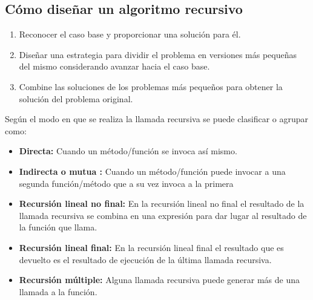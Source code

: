 \subsection{Cómo diseñar un algoritmo recursivo}

\begin{enumerate}
	\item Reconocer el caso base y proporcionar una solución
para él.
	\item Diseñar una estrategia para dividir el problema en
versiones más pequeñas del mismo considerando
avanzar hacia el caso base.
	\item Combine las soluciones de los problemas más
pequeños para obtener la solución del problema
original.
\end{enumerate}


Según el modo en que se realiza la llamada recursiva se puede clasificar o agrupar como:

\begin{itemize}
	\item \textbf{Directa:} Cuando un método/función se invoca así
mismo.
	\item \textbf{Indirecta o mutua :} Cuando un método/función puede
invocar a una segunda función/método que a su
vez invoca a la primera
	\item \textbf{Recursión lineal no final:} En la recursión lineal no final el resultado de la llamada recursiva se combina en una
	expresión para dar lugar al resultado de la función que llama.
	\item \textbf{Recursión lineal final:} En la recursión lineal final el resultado que es devuelto es el resultado de ejecución de la
	última llamada recursiva.
	\item \textbf{Recursión múltiple:} Alguna llamada recursiva puede generar más de una llamada a la función.
\end{itemize}


